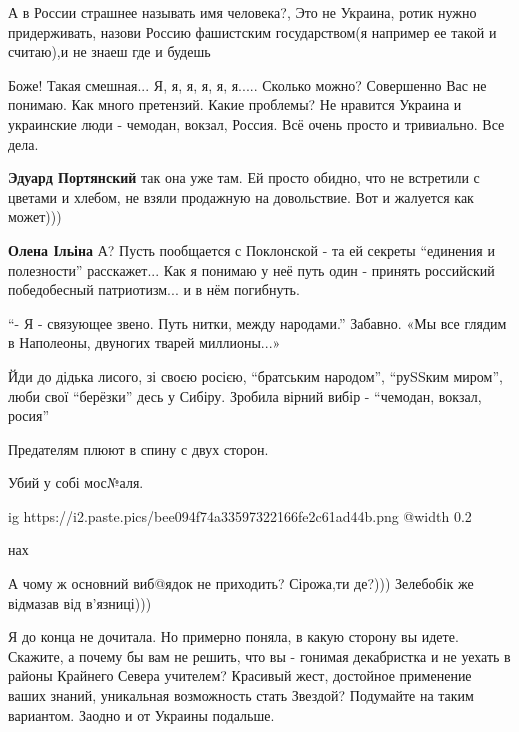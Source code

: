 \begin{itemize}
\begin{itemize}
\end{itemize} %


А в России страшнее называть имя человека?, Это не Украина, ротик нужно
придерживать, назови Россию фашистским государством(я например ее такой и
считаю),и не знаеш где и будешь


Боже! Такая смешная... Я, я, я, я, я, я..... Сколько можно? Совершенно Вас не
понимаю. Как много претензий. Какие проблемы? Не нравится Украина и украинские
люди - чемодан, вокзал, Россия. Всё очень просто и тривиально. Все дела.

\begin{itemize} %
\textbf{Эдуард Портянский} так она уже там. Ей просто обидно, что не встретили с цветами и хлебом, не взяли продажную на довольствие. Вот и жалуется как может)))

\textbf{Олена Ільіна} А? Пусть пообщается с Поклонской - та ей секреты \enquote{единения и полезности} расскажет... Как я понимаю у неё путь один - принять российский победобесный патриотизм... и в нём погибнуть.
\end{itemize} %


\enquote{- Я - связующее звено. Путь нитки, между народами.} Забавно. «Мы все
глядим в Наполеоны, двуногих тварей миллионы...»


Йди до дідька лисого, зі своєю росією, \enquote{братським народом}, \enquote{руSSким миром},
люби свої \enquote{берёзки} десь у Сибіру. Зробила вірний вибір - \enquote{чемодан, вокзал,
росия}


Предателям плюют в спину с двух сторон.

Убий у собі мос№аля.

\ifcmt
  ig https://i2.paste.pics/bee094f74a33597322166fe2c61ad44b.png
  @width 0.2
\fi

нах

А чому ж основний виб@ядок не приходить? Сірожа,ти де?))) Зелебобік же відмазав від в'язниці)))


Я до конца не дочитала. Но примерно поняла, в какую сторону вы идете. Скажите,
а почему бы вам не решить, что вы - гонимая декабристка и не уехать в районы
Крайнего Севера учителем? Красивый жест, достойное применение ваших знаний,
уникальная возможность стать Звездой? Подумайте на таким вариантом. Заодно и от
Украины подальше.


\end{itemize}
